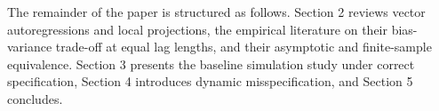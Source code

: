 The remainder of the paper is structured as follows. Section 2 reviews vector autoregressions 
and local projections, the empirical literature on their bias-variance trade-off at equal 
lag lengths, and their asymptotic and finite-sample equivalence. Section 3 presents the 
baseline simulation study under correct specification, Section 4 introduces dynamic 
misspecification, and Section 5 concludes.

\FloatBarrier